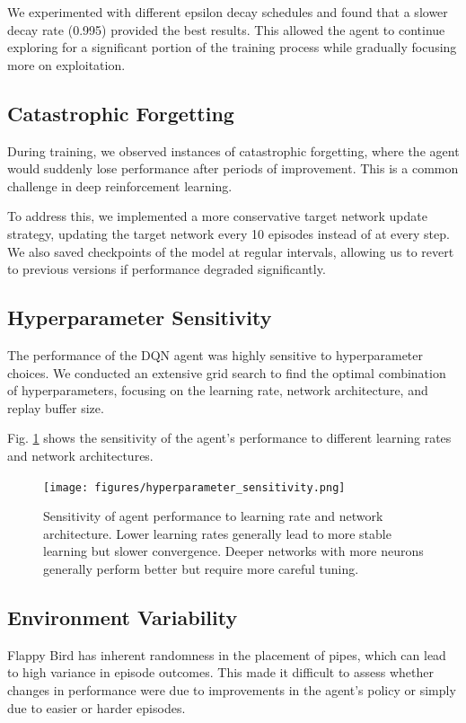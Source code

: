 \documentclass[conference]{IEEEtran}
\begin{document}
We experimented with different epsilon decay schedules and found that a slower decay rate (0.995) provided the best results. This allowed the agent to continue exploring for a significant portion of the training process while gradually focusing more on exploitation.

\subsection{Catastrophic Forgetting}
During training, we observed instances of catastrophic forgetting, where the agent would suddenly lose performance after periods of improvement. This is a common challenge in deep reinforcement learning.

To address this, we implemented a more conservative target network update strategy, updating the target network every 10 episodes instead of at every step. We also saved checkpoints of the model at regular intervals, allowing us to revert to previous versions if performance degraded significantly.

\subsection{Hyperparameter Sensitivity}
The performance of the DQN agent was highly sensitive to hyperparameter choices. We conducted an extensive grid search to find the optimal combination of hyperparameters, focusing on the learning rate, network architecture, and replay buffer size.

Fig. \ref{fig:hyperparameter_sensitivity} shows the sensitivity of the agent's performance to different learning rates and network architectures.

\begin{figure}[!t]
\centering
\texttt{[image: figures/hyperparameter\_sensitivity.png]}
\caption{Sensitivity of agent performance to learning rate and network architecture. Lower learning rates generally lead to more stable learning but slower convergence. Deeper networks with more neurons generally perform better but require more careful tuning.}
\label{fig:hyperparameter_sensitivity}
\end{figure}

\subsection{Environment Variability}
Flappy Bird has inherent randomness in the placement of pipes, which can lead to high variance in episode outcomes. This made it difficult to assess whether changes in performance were due to improvements in the agent's policy or simply due to easier or harder episodes.
\end{document}
